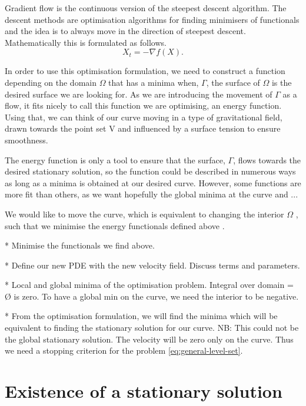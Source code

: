 Gradient flow is the continuous version of the steepest descent algorithm. The descent methods are optimisation algorithms for finding minimisers of functionals and the idea is
to always move in the direction of steepest descent. Mathematically this is formulated as follows.  
\begin{equation}
    X_t = -\nabla f(X).
\end{equation}

In order to use this optimisation formulation, we need to construct a function depending
on the domain $\Omega$ that has a minima when, $\Gamma$, the surface of $\Omega$
is the desired surface we are looking for. As we are introducing the movement of $\Gamma$
as a flow, it fits nicely to call this function we are optimising, an energy function. 
Using that, we can think of our curve moving in a type of gravitational field, drawn
towards the point set V and influenced by a surface tension to ensure smoothness. 

The energy function is only a tool to ensure that the surface, $\Gamma$, flows towards the
desired stationary solution, so the function could be described in numerous ways as long 
as a minima is obtained at our desired curve. However, some functions are more fit than others, as we want hopefully the global minima at the curve and ...    

We would like to move the curve, which is equivalent to changing the interior 
$\Omega$ , such that we minimise the energy functionals defined above . 

* Minimise the functionals we find above. 

* Define our new PDE with the new velocity field. Discuss terms and parameters.

* Local and global minima of the optimisation problem. Integral over domain = Ø is zero. To have a global min on the curve, we need the interior to be negative.

* From the optimisation formulation, we will find the minima which will
be equivalent to finding the stationary solution for our curve. NB: This could not be
the global stationary solution. The velocity will be zero only on the curve. Thus 
we need a stopping criterion for the problem \eqref{eq:general-level-set}. 

\section{Existence of a stationary solution}


